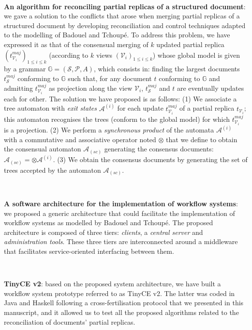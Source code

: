 ~

\noindent\textbf{An algorithm for reconciling partial replicas of a structured document}: we gave a solution to the conflicts that arose when merging partial replicas of a structured document by developing reconciliation and control techniques adapted to the modelling of Badouel and Tchoup\'e. To address this problem, we have expressed it as that of the consensual merging of $k$ updated partial replica $(t_{\mathcal{V}_i}^{maj})_{1 \leq i\leq k}$ (according to $k$ views $(\mathcal{V}_i)_{1 \leq i\leq k}$) whose global model is given by a grammar $\mathbb{G}=\left(\mathcal{S},\mathcal{P},A\right)$, which consists in: finding the largest documents $t^{maj}_{\mathcal{S}}$ conforming to $\mathbb{G}$ such that, for any document $t$ conforming to $\mathbb{G}$ and admitting $t_{\mathcal{V}_i}^{maj}$ as projection along the view ${\mathcal{V}_i}$, $t^{maj}_{\mathcal{S}}$ and $t$ are eventually updates each for other. 
The solution we have proposed is as follows: (1) We associate a tree automaton with \textit{exit states} $\mathcal{A}^{(i)}$ for each update $t_{\mathcal{V}_i}^{maj}$ of a partial replica $t_{\mathcal{V}_i}$; this automaton recognises the trees (conform to the global model) for which $t_{\mathcal{V}_i}^{maj}$ is a projection. (2) We perform a \textit{synchronous product} of the automata $\mathcal{A}^{(i)}$ with a commutative and associative operator noted $\otimes$ that we define to obtain the consensual automaton $\mathcal{A}_{(sc)}$ generating the consensus documents: $\mathcal{A}_{(sc)}=\otimes\mathcal{A}^{(i)}$. (3) We obtain the consensus documents by generating the set of trees accepted by the automaton $\mathcal{A}_{(sc)}$.



~

\noindent\textbf{A software architecture for the implementation of workflow systems}: we proposed a generic architecture that could facilitate the implementation of workflow systems as modelled by Badouel and Tchoup\'e. The proposed architecture is composed of three tiers: \textit{clients}, a \textit{central server} and \textit{administration tools}. These three tiers are interconnected around a middleware that facilitates service-oriented interfacing between them.



~

\noindent\textbf{TinyCE v2}: based on the proposed system architecture, we have built a workflow system prototype referred to as TinyCE v2. The latter was coded in Java and Haskell following a cross-fertilisation protocol that we presented in this manuscript, and it allowed us to test all the proposed algorithms related to the reconciliation of documents' partial replicas.



